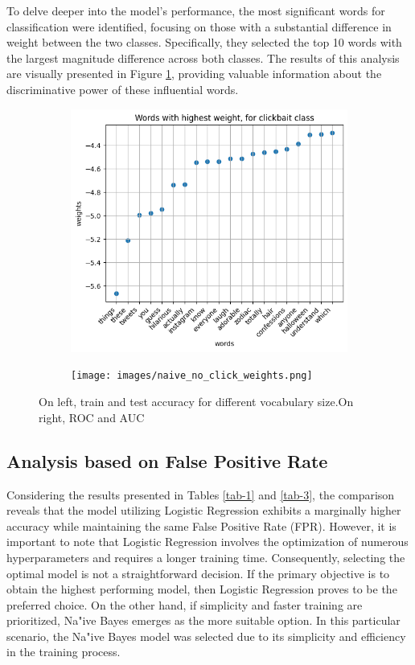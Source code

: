 \documentclass{class}
\begin{document}
To delve deeper into the model's performance, the most significant words for classification were identified,
focusing on those with a substantial difference in weight between the two classes.
Specifically, they selected the top 10 words with the largest magnitude difference across both classes.
The results of this analysis are visually presented in Figure \ref{fig-13},
providing valuable information about the discriminative power of these influential words.
\begin{figure}[h]
    \begin{subfigure}{.5\linewidth}
        \includegraphics[width=\linewidth]{images/naive_click_weights.png}
    \end{subfigure}%
    \begin{subfigure}{.5\linewidth}
        \texttt{[image: images/naive\_no\_click\_weights.png]}
    \end{subfigure}
    \caption{On left, train and test accuracy for different vocabulary size.On right, ROC and AUC}
    \label{fig-13}
\end{figure}

\subsection{Analysis based on False Positive Rate}
Considering the results presented in Tables \ref{tab-1} and \ref{tab-3}, the comparison reveals that
the model utilizing Logistic Regression exhibits a marginally higher accuracy while maintaining the same False Positive Rate (FPR).
However, it is important to note that Logistic Regression involves the optimization of numerous hyperparameters and requires a longer training time.
Consequently, selecting the optimal model is not a straightforward decision. If the primary objective is to obtain the highest performing model,
then Logistic Regression proves to be the preferred choice.
On the other hand, if simplicity and faster training are prioritized,
Na"ive Bayes emerges as the more suitable option. In this particular scenario, the Na"ive Bayes model was selected due to its simplicity and efficiency
in the training process.
\end{document}
